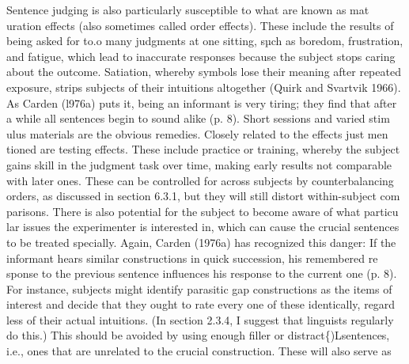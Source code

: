 \begin{styleTextbody}
Sentence judging is also particularly susceptible to what are known as mat\- uration effects (also sometimes called order effects). These include the results of being asked for to.o many judgments at one sitting, sµch as boredom, frustration, and fatigue, which lead to inaccurate responses because the subject stops caring about the outcome. Satiation, whereby symbols lose their meaning after repeated exposure, strips subjects of their intuitions altogether (Quirk and Svartvik 1966). As Carden (l976a) puts it, {\textquotedbl}being an informant is very tiring; they find that after a while all sentences begin to sound alike{\textquotedbl} (p. 8). Short sessions and varied stim\- ulus materials are the obvious remedies. Closely related to the effects just men\- tioned are testing effects. These include practice or training, whereby the subject gains skill in the judgment task over time, making early results not comparable with later ones. These can be controlled for across subjects by counterbalancing orders, as discussed in section 6.3.1, but they will still distort within-subject com\- parisons. There is also potential for the subject to become aware of what particu\- lar issues the experimenter is interested in, which can cause the crucial sentences to be treated specially. Again, Carden (1976a) has recognized this danger: {\textquotesingle}{\textquotesingle}If the informant hears similar constructions in quick succession, his remembered re\- sponse to the previous sentence influences his response to the current one{\textquotedbl} (p. 8). For instance, subjects might identify parasitic gap constructions as the items of interest and decide that they ought to rate every one of these identically, regard\- less of their actual intuitions. (In section 2.3.4, I suggest that linguists regularly do this.) This should be avoided by using enough filler or distract\{)Lsentences, i.e., ones that are unrelated to the crucial construction. These will also serve as
\end{styleTextbody}


